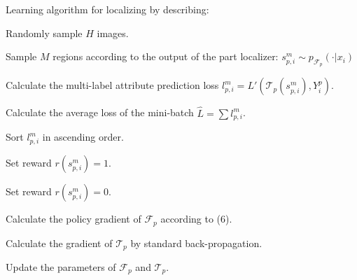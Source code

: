 \documentclass{article}
\begin{document}
\begin{algorithm}[t]
\caption{Learning algorithm for localizing by describing: }
\begin{algorithmic}[1]
\renewcommand{\algorithmicrequire}{\textbf{Input:}}
\renewcommand{\algorithmicensure}{\textbf{Output:}}



\REPEAT

\STATE Randomly sample $H$ images.


\STATE Sample $M$ regions according to the output of the part localizer: $s^m_{p,i} \sim p_{\mathcal{F}_p} (\cdot|x_i)$

\ENDFOR


\STATE Calculate the multi-label attribute prediction loss $l_{p,i}^m = L'(\mathcal{T}_p(s^m_{p,i}), Y^p_i)$.

\ENDFOR

\STATE Calculate the average loss of the mini-batch $\hat{L} = \sum l_{p,i}^m$.


\STATE Sort $l_{p,i}^m$ in ascending order.



\STATE Set reward $r(s^m_{p,i}) = 1$.

\ELSE

\STATE Set reward $r(s^m_{p,i}) = 0$.

\ENDIF

\ENDFOR

\ENDFOR

\STATE Calculate the policy gradient of $\mathcal{F}_p$ according to (6).

\STATE Calculate the gradient of $\mathcal{T}_p$ by standard back-propagation.

\STATE Update the parameters of $\mathcal{F}_p$ and $\mathcal{T}_p$.


\ENDFOR

\end{algorithmic}
\end{algorithm}
\end{document}
